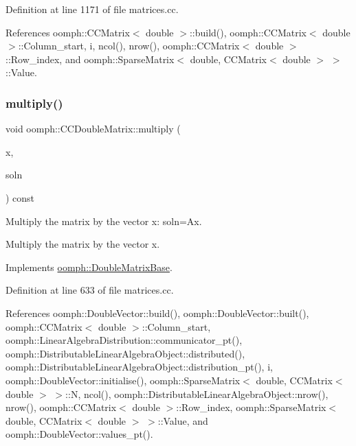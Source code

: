 Definition at line 1171 of file matrices.\+cc.



References oomph\+::\+C\+C\+Matrix$<$ double $>$\+::build(), oomph\+::\+C\+C\+Matrix$<$ double $>$\+::\+Column\+\_\+start, i, ncol(), nrow(), oomph\+::\+C\+C\+Matrix$<$ double $>$\+::\+Row\+\_\+index, and oomph\+::\+Sparse\+Matrix$<$ double, C\+C\+Matrix$<$ double $>$ $>$\+::\+Value.

\mbox{\label{classoomph_1_1CCDoubleMatrix_add24c25e344b84fb5b732e294af5e8b2}} 
\subsubsection{\texorpdfstring{multiply()}{multiply()}\hspace{0.1cm}{\footnotesize\ttfamily [1/2]}}
{\footnotesize\ttfamily void oomph\+::\+C\+C\+Double\+Matrix\+::multiply (\begin{DoxyParamCaption}\item[{const \hyperlink{classoomph_1_1DoubleVector}{Double\+Vector} \&}]{x,  }\item[{\hyperlink{classoomph_1_1DoubleVector}{Double\+Vector} \&}]{soln }\end{DoxyParamCaption}) const\hspace{0.3cm}{\ttfamily [virtual]}}



Multiply the matrix by the vector x\+: soln=Ax. 

Multiply the matrix by the vector x. 

Implements \hyperlink{classoomph_1_1DoubleMatrixBase_a78204eab557e0dc99618e41a28a5c092}{oomph\+::\+Double\+Matrix\+Base}.



Definition at line 633 of file matrices.\+cc.



References oomph\+::\+Double\+Vector\+::build(), oomph\+::\+Double\+Vector\+::built(), oomph\+::\+C\+C\+Matrix$<$ double $>$\+::\+Column\+\_\+start, oomph\+::\+Linear\+Algebra\+Distribution\+::communicator\+\_\+pt(), oomph\+::\+Distributable\+Linear\+Algebra\+Object\+::distributed(), oomph\+::\+Distributable\+Linear\+Algebra\+Object\+::distribution\+\_\+pt(), i, oomph\+::\+Double\+Vector\+::initialise(), oomph\+::\+Sparse\+Matrix$<$ double, C\+C\+Matrix$<$ double $>$ $>$\+::N, ncol(), oomph\+::\+Distributable\+Linear\+Algebra\+Object\+::nrow(), nrow(), oomph\+::\+C\+C\+Matrix$<$ double $>$\+::\+Row\+\_\+index, oomph\+::\+Sparse\+Matrix$<$ double, C\+C\+Matrix$<$ double $>$ $>$\+::\+Value, and oomph\+::\+Double\+Vector\+::values\+\_\+pt().


